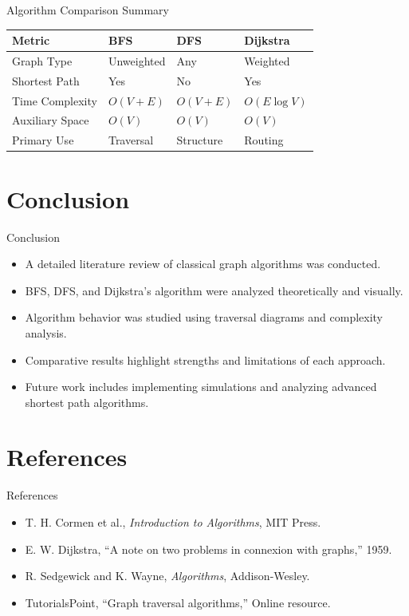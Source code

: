 \documentclass[dvipsnames,mathserif,aspectratio=169,10pt]{beamer}
\begin{document}
\begin{frame}{Algorithm Comparison Summary}
\begin{table}
\centering
\begin{tabular}{|l|l|l|l|}
\hline
\textbf{Metric} & \textbf{BFS} & \textbf{DFS} & \textbf{Dijkstra} \\
\hline
Graph Type & Unweighted & Any & Weighted \\
\hline
Shortest Path & Yes & No & Yes \\
\hline
Time Complexity & $O(V+E)$ & $O(V+E)$ & $O(E\log V)$ \\
\hline
Auxiliary Space & $O(V)$ & $O(V)$ & $O(V)$ \\
\hline
Primary Use & Traversal & Structure & Routing \\
\hline
\end{tabular}
\end{table}
\transfade[duration=0.2]
\end{frame}



\section{Conclusion}
\begin{frame}{Conclusion}
    \begin{itemize}
        \item A detailed literature review of classical graph algorithms was conducted.
        \item BFS, DFS, and Dijkstra's algorithm were analyzed theoretically and visually.
        \item Algorithm behavior was studied using traversal diagrams and complexity analysis.
        \item Comparative results highlight strengths and limitations of each approach.
        \item Future work includes implementing simulations and analyzing advanced shortest path algorithms.
    \end{itemize}
    \transfade[duration=0.2]
\end{frame}



\section{References}
\begin{frame}{References}
    \begin{itemize}
        \item [1] T. H. Cormen et al., \textit{Introduction to Algorithms}, MIT Press.
        \item [2] E. W. Dijkstra, ``A note on two problems in connexion with graphs,'' 1959.
        \item [3]  R. Sedgewick and K. Wayne, \textit{Algorithms}, Addison-Wesley.
        \item [4] TutorialsPoint, ``Graph traversal algorithms,'' Online resource.
    \end{itemize}
\transfade[duration=0.2]
\end{frame}
\end{document}
